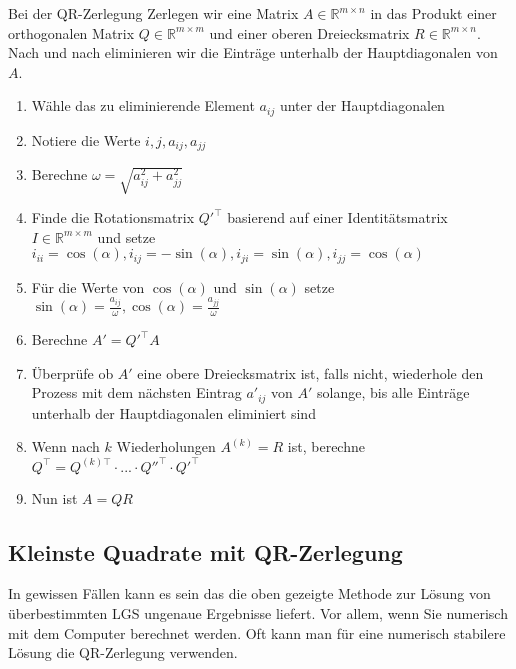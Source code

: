 \begin{tcolorbox}[colback=gray!30, colframe=gray!80, title=QR-Zerlegung]
    Bei der QR-Zerlegung Zerlegen wir eine Matrix \( A \in \mathbb{R}^{m \times n} \) in das Produkt einer orthogonalen Matrix \( Q \in \mathbb{R}^{m \times m} \) und einer oberen Dreiecksmatrix \( R \in \mathbb{R}^{m \times n} \). Nach und nach eliminieren wir die Einträge unterhalb der Hauptdiagonalen von \( A \). 
    \begin{enumerate}
        \item Wähle das zu eliminierende Element \( a_{ij} \) unter der Hauptdiagonalen
        \item Notiere die Werte \( i, j, a_{ij}, a_{jj} \)
        \item Berechne \( \omega = \sqrt{a_{ij}^2 + a_{jj}^2} \)
        \item Finde die Rotationsmatrix \( Q'^\top \) basierend auf einer Identitätsmatrix \( I \in \mathbb{R}^{m \times m} \) und setze \( i_{ii} = \cos(\alpha), i_{ij} = -\sin(\alpha), i_{ji} = \sin(\alpha), i_{jj} = \cos(\alpha) \)
        \item Für die Werte von \( \cos(\alpha) \) und \( \sin(\alpha) \) setze \( \sin(\alpha) = \frac{a_{ij}}{\omega}, \cos(\alpha) = \frac{a_{jj}}{\omega} \)
        \item Berechne \( A' = Q'^\top A \)
        \item Überprüfe ob \( A' \) eine obere Dreiecksmatrix ist, falls nicht, wiederhole den Prozess mit dem nächsten Eintrag \( a'_{ij} \) von \( A' \) solange, bis alle Einträge unterhalb der Hauptdiagonalen eliminiert sind
        \item Wenn nach \( k \) Wiederholungen \( A^{(k)} = R \) ist, berechne \( Q^\top = Q^{(k) \top} \cdot ... \cdot Q''^\top \cdot Q'^\top \)
        \item Nun ist \(A = QR\)
    \end{enumerate}
\end{tcolorbox}

\subsection{Kleinste Quadrate mit QR-Zerlegung}

In gewissen Fällen kann es sein das die oben gezeigte Methode zur Lösung von überbestimmten LGS ungenaue Ergebnisse liefert. Vor allem, wenn Sie numerisch mit dem Computer berechnet werden. Oft kann man für eine numerisch stabilere Lösung die QR-Zerlegung verwenden. 

